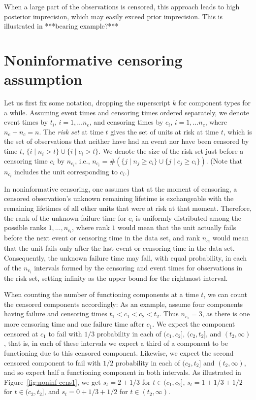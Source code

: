 \documentclass[12pt, a4paper]{elsarticle}
\begin{document}
When a large part of the observations is censored,
this approach leads to high posterior imprecision,
which may easily exceed prior imprecision.
This is illustrated in ***bearing example?***


\section{Noninformative censoring assumption}

Let us first fix some notation, dropping the superscript $k$ for component types for a while.
Assuming event times and censoring times ordered separately,
we denote event times by $t_i$, $i=1, \ldots n_e$,
and censoring times by $c_i$, $i=1, \ldots n_c$,
where $n_e + n_c = n$.
The \emph{risk set} at time $t$ gives the set of units at risk at time $t$,
which is the set of observations that neither have had an event nor have been censored by time $t$,
$\{ i \mid n_i > t \} \cup \{ i \mid c_i > t \}$.
We denote the size of the risk set just before a censoring time $c_i$ by $n_{c_i}$,
i.e., $n_{c_i} = \#(\{ j \mid n_j \ge c_i \} \cup \{ j \mid c_j \ge c_i \})$.
(Note that $n_{c_i}$ includes the unit corresponding to $c_i$.)

In noninformative censoring, one assumes that
at the moment of censoring, a censored observation's unknown remaining lifetime
is exchangeable with the remaining lifetimes of all other units that were at risk at that moment. %
Therefore, the rank of the unknown failure time for $c_i$ is uniformly distributed among the possible ranks $1, \ldots, n_{c_i}$,
where rank $1$ would mean that the unit actually fails before the next event or censoring time in the data set,
and rank $n_{c_i}$ would mean that the unit fails only after the last event or censoring time in the data set.
Consequently, the unknown failure time may fall, with equal probability,
in each of the $n_{c_i}$ intervals formed by the censoring and event times for observations in the risk set,
setting infinity as the upper bound for the rightmost interval.

When counting the number of functioning components at a time $t$,
we can count the censored components accordingly:
As an example, assume four components having failure and censoring times $t_1 < c_1 < c_2 < t_2$.
Thus $n_{c_1} = 3$, as there is one more censoring time and one failure time after $c_1$.
We expect the component censored at $c_1$ to fail with $1/3$ probability in each of
$(c_1, c_2]$, $(c_2, t_2]$, and $(t_2, \infty)$,
that is, in each of these intervals we expect a third of a component to be functioning
due to this censored component.
Likewise, we expect the second censored component to fail with $1/2$ probability
in each of $(c_2, t_2]$ and $(t_2, \infty)$,
and so expect half a functioning component in both intervals.
%
As illustrated in Figure~\ref{fig:noninf-cens1},
we get $s_t = 2 + 1/3$ for $t \in (c_1, c_2]$,
$s_t = 1 + 1/3 + 1/2$ for $t \in (c_2, t_2]$,
and $s_t = 0 + 1/3 + 1/2$ for $t \in (t_2, \infty)$.
\end{document}
